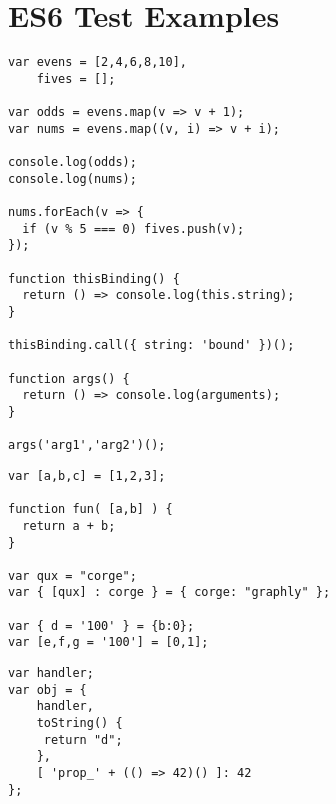 
\chapter{ES6 Test Examples} %

\label{AppendixC} %


\begin{lstlisting}[caption=Arrow function]
var evens = [2,4,6,8,10],
    fives = [];

var odds = evens.map(v => v + 1);
var nums = evens.map((v, i) => v + i);

console.log(odds);
console.log(nums);

nums.forEach(v => {
  if (v % 5 === 0) fives.push(v);
});

function thisBinding() {
  return () => console.log(this.string);
}

thisBinding.call({ string: 'bound' })();

function args() {
  return () => console.log(arguments);
}

args('arg1','arg2')();
\end{lstlisting}

\begin{lstlisting}[caption=Destructuring]
var [a,b,c] = [1,2,3];

function fun( [a,b] ) {
  return a + b;
}

var qux = "corge";
var { [qux] : corge } = { corge: "graphly" };

var { d = '100' } = {b:0};
var [e,f,g = '100'] = [0,1];
\end{lstlisting}

\begin{lstlisting}[caption=Object literals]
var handler;
var obj = {
    handler,
    toString() {
     return "d";
    },
    [ 'prop_' + (() => 42)() ]: 42
};
\end{lstlisting}